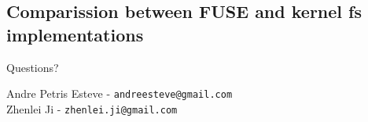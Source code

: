 \documentclass{beamer}
\begin{document}
\subsection{Comparission between FUSE and kernel fs implementations}


\begin{frame}[plain]

  \begin{center}
    \Huge Questions?
  \end{center}

  \vspace{0.2in}

  \begin{center}
	Andre Petris Esteve - \texttt{andreesteve@gmail.com}\\
	Zhenlei Ji - \texttt{zhenlei.ji@gmail.com}
  \end{center}
\end{frame}
\end{document}
